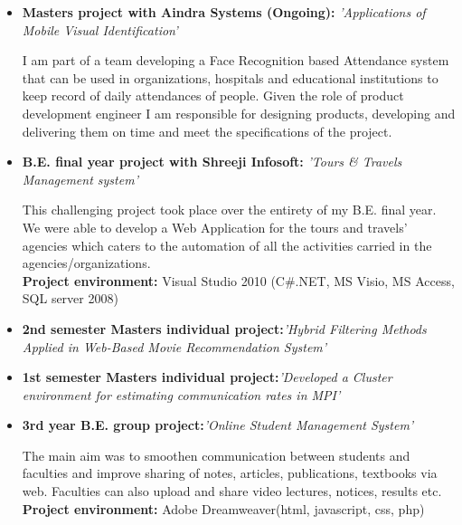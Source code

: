 \documentclass[11pt,a4paper,sans]{moderncv}        %
\begin{document}
\begin{itemize}

\item{\textbf{Masters project with Aindra Systems (Ongoing):} \textit{'Applications of Mobile Visual Identification'}

\vspace{3pt}

\small{I am part of a team developing a Face Recognition based Attendance system that can be used in organizations, hospitals and educational institutions to keep record of daily attendances of people. Given the role of product development engineer I am responsible for designing products, developing and delivering them on time and meet the specifications of the project.}}

\newpage

\item{\textbf{B.E. final year project with Shreeji Infosoft:} \textit{'Tours \& Travels Management system'}

\vspace{3pt}

\small{This challenging project took place over the entirety of my B.E. final year. We were able to develop a Web Application for the tours and travels’ agencies which caters to the automation of all the activities carried in the agencies/organizations.}
\\ \textbf{ Project environment:} Visual Studio 2010 (C\#.NET, MS Visio, MS Access, SQL server 2008)
}

\vspace{8pt}

\item{\textbf{2nd semester Masters individual project:}\textit{'Hybrid Filtering Methods Applied in Web-Based Movie Recommendation System'}}

\vspace{8pt}

\item{\textbf{1st semester Masters individual project:}\textit{'Developed a Cluster environment for estimating communication rates in MPI'}}



\vspace{8pt}

\item{\textbf{3rd year B.E. group project:}\textit{'Online Student Management System'}

\vspace{3pt}

\small{The main aim was to smoothen communication between students and faculties and improve sharing of notes, articles, publications, textbooks via web. Faculties can also upload and share video lectures, notices, results etc.}
\\ \textbf{Project environment:} Adobe Dreamweaver(html, javascript, css, php)
}

\end{itemize}
\end{document}

